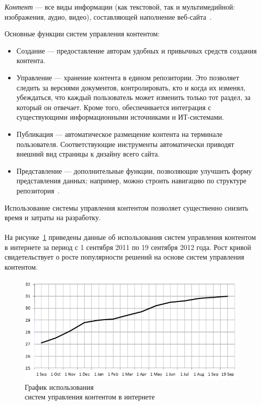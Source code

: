 \textit{Контент} --- все виды информации (как текстовой, так и мультимедийной: изображения, аудио, видео),
составляющей наполнение веб-сайта~\cite{wiki_content}.

Основные функции систем управления контентом:
\begin{itemize}
\item
  Создание --- предоставление авторам удобных и привычных средств создания контента.

\item
  Управление --- хранение контента в едином репозитории. 
  Это позволяет следить за версиями документов, контролировать, кто и когда их изменял, убеждаться,
  что каждый пользователь может изменить только тот раздел, за который он отвечает.
  Кроме того, обеспечивается интеграция с существующими информационными источниками и ИТ-системами.

\item
  Публикация --- автоматическое размещение контента на терминале пользователя. 
  Соответствующие инструменты автоматически приводят внешний вид страницы к дизайну всего сайта.

\item
  Представление --- дополнительные функции, позволяющие улучшить форму представления данных; например,
  можно строить навигацию по структуре репозитория~\cite{osp_cms_functions}.
\end{itemize}

Использование системы управления контентом позволяет существенно снизить время и затраты на разработку.

\paragraph{}
На рисунке~\ref{fig:cms_usage_dynamic} приведены данные об использования систем управления контентом в интернете за период
с 1 сентября 2011 по 19 сентября 2012 года. Рост кривой свидетельствует о росте популярности решений на 
основе систем управления контентом.

\begin{figure}[h]
  \centering
  \includegraphics[width=150mm]{pic/dynamic_cms_usage.png}
  \caption{График использования \\ систем управления контентом в интернете}
  \label{fig:cms_usage_dynamic}
\end{figure}

